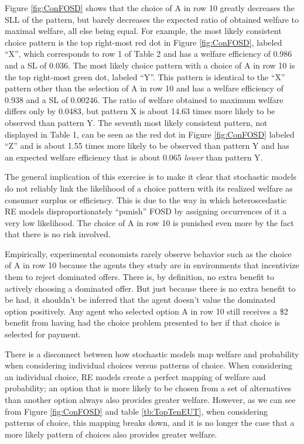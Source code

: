 \documentclass[../main.tex]{subfiles}
\begin{document}
Figure \ref{fig:ConFOSD} shows that the choice of A in row 10 greatly decreases the SLL of the pattern, but barely decreases the expected ratio of obtained welfare to maximal welfare, all else being equal.
For example, the most likely consistent choice pattern is the top right-most red dot in Figure \ref{fig:ConFOSD}, labeled \enquote{X}, which corresponds to row 1 of Table 2 and has a welfare efficiency of 0.986 and a SL of 0.036.
The most likely choice pattern with a choice of A in row 10 is the top right-most green dot, labeled \enquote{Y}.
This pattern is identical to the \enquote{X} pattern other than the selection of A in row 10 and has a welfare efficiency of 0.938 and a SL of 0.00246.
The ratio of welfare obtained to maximum welfare differs only by 0.0483, but pattern X is about 14.63 times more likely to be observed than pattern Y.{\footnotemark}
The seventh most likely consistent pattern, not displayed in Table 1, can be seen as the red dot in Figure \ref{fig:ConFOSD} labeled \enquote{Z} and is about 1.55 times more likely to be observed than pattern Y and has an expected welfare efficiency that is about 0.065 \textit{lower} than pattern Y.

\addtocounter{footnote}{-1}

The general implication of this exercise is to make it clear that stochastic models do not reliably link the likelihood of a choice pattern with its realized welfare as consumer surplus or efficiency.
This is due to the way in which heteroscedastic RE models disproportionately \enquote{punish} FOSD by assigning occurrences of it a very low likelihood.
The choice of A in row 10 is punished even more by the fact that there is no risk involved.

Empirically, experimental economists rarely observe behavior such as the choice of A in row 10 because the agents they study are in environments that incentivize them to reject dominated offers.
There is, by definition, no extra benefit to actively choosing a dominated offer.
But just because there is no extra benefit to be had, it shouldn't be inferred that the agent doesn't value the dominated option positively.
Any agent who selected option A in row 10 still receives a \$2 benefit from having had the choice problem presented to her if that choice is selected for payment.

There is a disconnect between how stochastic models map welfare and probability when considering individual choices versus patterns of choice.
When considering an individual choice, RE models create a perfect mapping of welfare and probability; an option that is more likely to be chosen from a set of alternatives than another option always also provides greater welfare.
However, as we can see from Figure \ref{fig:ConFOSD} and table \ref{tb:TopTenEUT}, when considering patterns of choice, this mapping breaks down, and it is no longer the case that a more likely pattern of choices also provides greater welfare.
\end{document}
